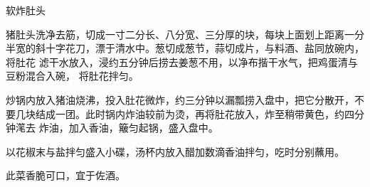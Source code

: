 %
%
%
%
%
%
%
\begin{recipe}{软炸肚头}

\ingredients


\preparation

\step 猪肚头洗净去筋，切成一寸二分长、八分宽、三分厚的块，每块上面划上距离一分
半宽的斜十字花刀，漂于清水中。葱切成葱节，蒜切成片，与料酒、盐同放碗内，将肚花
滤干水放入，浸约五分钟后捞去姜葱不用，以净布揩干水气，把鸡蛋清与豆粉混合入碗，
将肚花拌匀。

\step 炒锅内放入猪油烧沸，投入肚花微炸，约三分钟以漏瓢捞入盘中，把它分散开，不
要几块结成一团。此时锅内炸油较前为烫，再将肚花放入，炸至稍带黄色，约四分钟滗去
炸油，加入香油，簸匀起锅，盛入盘中。

\step 以花椒末与盐拌匀盛入小碟，汤杯内放入醋加数滴香油拌匀，吃时分别蘸用。

\features

此菜香脆可口，宜于佐酒。

\end{recipe}

